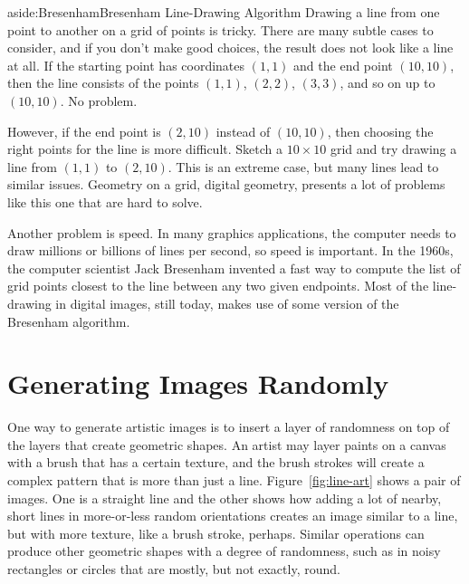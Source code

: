 \begin{aside}{aside:Bresenham}{Bresenham Line-Drawing Algorithm}
Drawing a line from one point to another on a grid of points is tricky.
There are many subtle cases to consider, and
if you don't make good choices, the result does not look
like a line at all. If the starting point has
coordinates $(1,1)$ and the end point $(10,10)$,
then the line consists of the points $(1,1)$,
$(2,2)$, $(3,3)$, and so on up to $(10,10)$.
No problem.

However, if the end point is $(2,10)$ instead of $(10,10)$,
then choosing the right points for the line is more difficult.
Sketch a $10\times10$ grid and try drawing a line
from  $(1,1)$ to  $(2,10)$.
This is an extreme case, but many lines lead to similar issues.
Geometry on a grid,
digital geometry,
presents a lot of problems like this one that are hard to solve.

Another problem is speed. In many graphics applications, the
computer needs to draw millions or billions of lines per second,
so speed is important.
In the 1960s, the computer scientist
Jack Bresenham invented
a fast way to compute the list of grid points closest to the line
between any two given endpoints.
Most of the line-drawing in digital images, still today,
makes use of some version of the Bresenham algorithm.
\end{aside}

\section{Generating Images Randomly}

One way to generate artistic images is to insert a layer of
randomness on top of the layers that create geometric shapes.
An artist may layer paints on a canvas
with a brush that has a certain texture, and the brush strokes
will create a complex pattern that is more than just a line.
Figure~\ref{fig:line-art} shows a pair of images.
One is a straight line
and the other shows how adding a lot of nearby, short lines in
more-or-less random orientations
creates an image similar to a line, but with more texture,
like a brush stroke, perhaps.
Similar operations can produce
other geometric shapes with a degree of randomness,
such as in noisy rectangles or circles that are
mostly, but not exactly, round.

